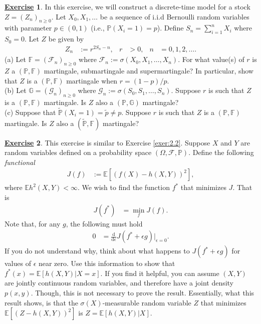 \documentclass[12pt]{book}
\let\varepsilon\epsilon
\numberwithin{equation}{chapter}
\theoremstyle{plain}
\numberwithin{theorem}{section}
\theoremstyle{definition}
\newtheorem{exercise}{\underline{Exercise}}
\numberwithin{exercise}{chapter}
\newcommand{\<}{\langle}
\renewcommand{\>}{\rangle}
\renewcommand{\(}{\left(}
\renewcommand{\)}{\right)}
\renewcommand{\[}{\left[}
\renewcommand{\]}{\right]}
\newcommand\Eb{\mathds{E}}
\newcommand\Fb{\mathds{F}}
\newcommand\Gb{\mathds{G}}
\newcommand\Pb{\mathds{P}}
\newcommand\Fc{\mathscr{F}}
\newcommand\Gc{\mathscr{G}}
\newcommand\eps{\varepsilon}
\newcommand\Om{\Omega}
\newcommand\sig{\sigma}
\newcommand\Pbt{\widetilde{\Pb}}
\newcommand\pt{\widetilde{p}}
\newcommand\dd{\mathrm{d}}
\begin{document}
\begin{exercise}
\label{exer:2.5}
In this exercise, we will construct a discrete-time model for a stock $Z = (Z_n)_{n \geq 0}$.
Let $X_0, X_1, \ldots$ be a sequence of i.i.d Bernoulli random variables with parameter $p \in (0,1)$ (i.e., $\Pb(X_i = 1) = p$).  Define $S_n = \sum_{i=1}^n X_i$ where $S_0 = 0$.  Let $Z$ be given by
\begin{align}
Z_n
	&:=	r^{2 S_n - n} , &
r
	&> 0 , &
n
	&=0, 1, 2, \ldots .
\end{align}
(a) Let $\Fb = (\Fc_n)_{n \geq 0}$ where $\Fc_n := \sig(X_0,X_1,\ldots,X_n)$.  For what value(s) of $r$ is $Z$ a $(\Pb,\Fb)$ martingale, submartingale and supermartingale?  In particular, show that $Z$ is a $(\Pb,\Fb)$ martingale when $r = (1-p)/p$.\\
(b) Let $\Gb = (\Gc_n)_{n \geq 0}$ where $\Gc_n := \sig(S_0,S_1,\ldots,S_n)$. Suppose $r$ is such that $Z$ is a $(\Pb,\Fb)$ martingale.  Is $Z$ also a $(\Pb,\Gb)$ martingale?\\
(c) Suppose that $\Pbt( X_i = 1 ) = \pt \neq p$.  Suppose $r$ is such that $Z$ is a $(\Pb,\Fb)$ martingale.  Is $Z$ also a $(\Pbt,\Fb)$ martingale?
\end{exercise}

\begin{exercise}
\label{exer:2.6}
This exercise is similar to Exercise \ref{exer:2.2}.  Suppose $X$ and $Y$ are random variables defined on a probability space $(\Om,\Fc,\Pb)$.  Define the following \textit{functional}
\begin{align}
J(f)
	&:=	\Eb[ ( f(X) - h(X,Y) )^2 ] ,
\end{align}
where $\Eb h^2(X,Y) < \infty$.  We wish to find the function $f^*$ that minimizes $J$.  That is
\begin{align}
J(f^*)
	&=	\min_f J(f) .
\end{align}
Note that, for any $g$, the following must hold
\begin{align}
0
	&=	\frac{\dd}{\dd \eps} J(f^* + \eps g) \Big|_{\eps = 0} .
\end{align}
If you do not understand why, think about what happens to $J(f^* + \eps g)$ for values of $\eps$ near zero.
Use this information to show that $f^*(x) = \Eb[ h(X,Y) | X = x]$.
If you find it helpful, you can assume $(X,Y)$ are jointly continuous random variables, and therefore have a joint density $p(x,y)$.  Though, this is not necessary to prove the result.  Essentially, what this result shows, is that the $\sig(X)$-measurable random variable $Z$ that minimizes $\Eb[ (Z - h(X,Y))^2 ]$ is $Z = \Eb[h(X,Y)|X]$.
\end{exercise}
\end{document}
